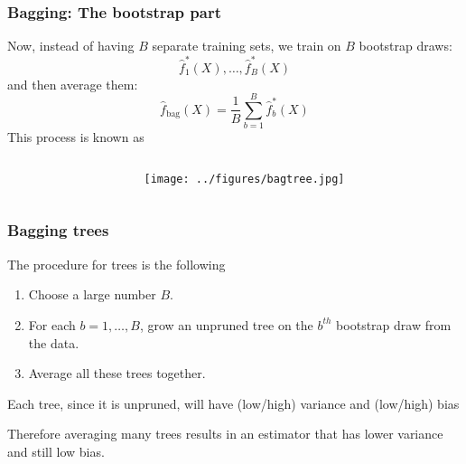 \documentclass[12pt]{beamer}
\begin{document}
\begin{frame}
             \begin{center} 
        \end{center}
\end{frame}

\begin{frame}[fragile]
\frametitle{Bagging: The bootstrap part}
Now, instead of having $B$ separate training sets, we train on  $B$ bootstrap draws:
\[
\hat f_1^{*}(X), \ldots, \hat f_B^{*}(X)
\]
and then average them:
\[
\hat f_{\textrm{bag}}(X) = \frac{1}{B} \sum_{b=1}^B \hat f_b^{*}(X)
\]
This process is known as 
\end{frame}

\begin{frame}
  \begin{columns}[c]
    \begin{column}{.45\paperwidth}
      \begin{center}
      \end{center}
    \end{column}
    \begin{column}{.5\paperwidth}
      \begin{center}
        \texttt{[image: ../figures/bagtree.jpg]}
      \end{center}
    \end{column}
  \end{columns}
\end{frame}


\begin{frame}[fragile]
\frametitle{Bagging trees}
The procedure for trees is the following
\begin{enumerate}
\item Choose a large number $B$.
\item For each $b = 1,\ldots, B$, grow an unpruned tree on the $b^{th}$ bootstrap draw from the data.
\item Average all these trees together.
\end{enumerate}
\vsp

Each tree, since it is unpruned, will have (low/\textcolor<2->{redmain}{high}) variance and
(\textcolor<2->{redmain}{low}/high) bias

\vsp
\pause
Therefore averaging many trees results in an estimator that has lower variance and still low bias.
\end{frame}
\end{document}
